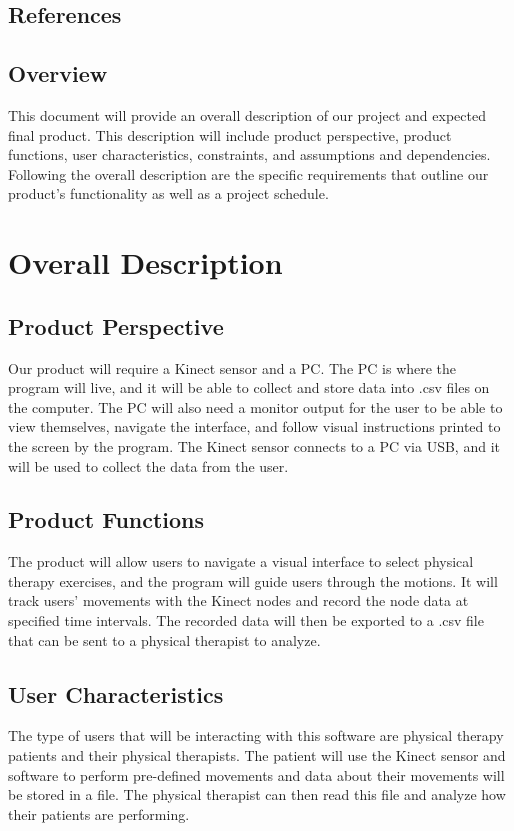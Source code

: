 \documentclass[onecolumn, draftclsnofoot,10pt, compsoc]{IEEEtran}
\begin{document}
\subsection{References}


\subsection{Overview}
This document will provide an overall description of our project and expected final 
product. This description will include product perspective, product functions, user 
characteristics, constraints, and assumptions and dependencies. Following the overall 
description are the specific requirements that outline our product's functionality as 
well as a project schedule.

\section{Overall Description}
\subsection{Product Perspective}
Our product will require a Kinect sensor and a PC. The PC is where the program will 
live, and it will be able to collect and store data into .csv files on the computer. 
The PC will also need a monitor output for the user to be able to view themselves, 
navigate the interface, and follow visual instructions printed to the screen by the 
program. The Kinect sensor connects to a PC via USB, and it will be used to collect 
the data from the user\cite{KinectDevelop}.

\subsection{Product Functions}
The product will allow users to navigate a visual interface to select physical therapy 
exercises, and the program will guide users through the motions. It will track users' 
movements with the Kinect nodes and record the node data at specified time intervals. 
The recorded data will then be exported to a .csv file that can be sent to a physical 
therapist to analyze.

\subsection{User Characteristics}
The type of users that will be interacting with this software are physical therapy 
patients and their physical therapists. The patient will use the Kinect sensor and 
software to perform pre-defined movements and data about their movements will be 
stored in a file. The physical therapist can then read this file and analyze how their 
patients are performing. 
\end{document}
